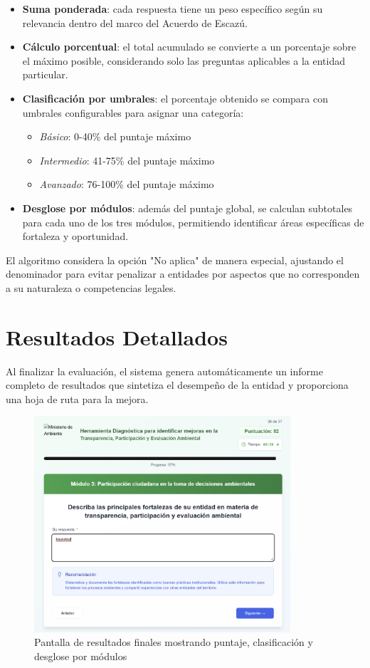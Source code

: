\documentclass[12pt,a4paper]{report}
\begin{document}
\begin{itemize}[leftmargin=*]
    \item \textbf{Suma ponderada}: cada respuesta tiene un peso específico según su relevancia dentro del marco del Acuerdo de Escazú.
    \item \textbf{Cálculo porcentual}: el total acumulado se convierte a un porcentaje sobre el máximo posible, considerando solo las preguntas aplicables a la entidad particular.
    \item \textbf{Clasificación por umbrales}: el porcentaje obtenido se compara con umbrales configurables para asignar una categoría:
    \begin{itemize}
        \item \textit{Básico}: 0-40\% del puntaje máximo
        \item \textit{Intermedio}: 41-75\% del puntaje máximo
        \item \textit{Avanzado}: 76-100\% del puntaje máximo
    \end{itemize}
    \item \textbf{Desglose por módulos}: además del puntaje global, se calculan subtotales para cada uno de los tres módulos, permitiendo identificar áreas específicas de fortaleza y oportunidad.
\end{itemize}

El algoritmo considera la opción "No aplica" de manera especial, ajustando el denominador para evitar penalizar a entidades por aspectos que no corresponden a su naturaleza o competencias legales.

\section{Resultados Detallados}
Al finalizar la evaluación, el sistema genera automáticamente un informe completo de resultados que sintetiza el desempeño de la entidad y proporciona una hoja de ruta para la mejora.

\begin{figure}[h]
    \centering
    \includegraphics[width=0.85\textwidth]{Captura de pantalla 2025-06-26 122659.png}
    \caption{Pantalla de resultados finales mostrando puntaje, clasificación y desglose por módulos}
\end{figure}
\end{document}
